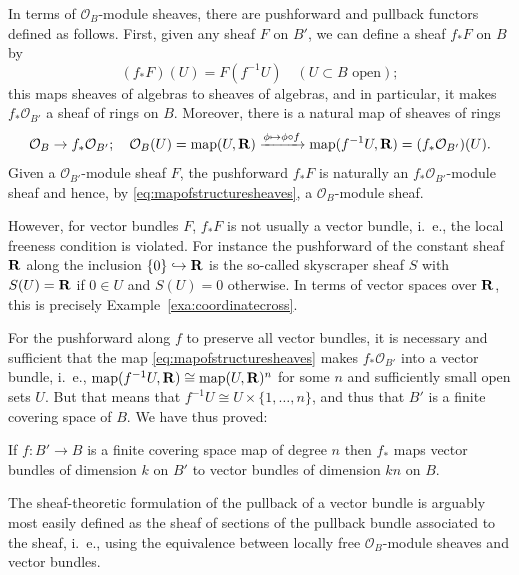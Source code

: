 \documentclass[a4paper,openany]{scrbook}
\begin{document}
In terms of $\mathcal O_B$-module sheaves, there are pushforward and pullback functors defined as follows. First, given any sheaf $F$ on $B'$, we can define a sheaf $f_*F$ on $B$ by
\[
(f_*F)(U) = F(f^{-1}U) \quad (U \subset B \text{ open});
\]
this maps sheaves of algebras to sheaves of algebras, and in particular, it makes $f_*\mathcal O_{B'}$ a sheaf of rings on $B$. Moreover, there is a natural map of sheaves of rings
\begin{equation}\label{eq:mapofstructuresheaves}
\mathcal O_{B} \to f_*\mathcal O_{B'}; \quad \mathcal O_B(U) = \operatorname{map}(U,\mathbf R) \xrightarrow{\phi \mapsto \phi \circ f} \operatorname{map}(f^{-1}U,\mathbf R) = (f_*\mathcal O_{B'})(U).
\end{equation}
Given a $\mathcal O_{B'}$-module sheaf $F$, the pushforward $f_*F$ is naturally an $f_*\mathcal O_{B'}$-module sheaf and hence, by \eqref{eq:mapofstructuresheaves}, a $\mathcal O_B$-module sheaf.

However, for vector bundles $F$, $f_*F$ is not usually a vector bundle, i.~e., the local freeness condition is violated. For instance the pushforward of the constant sheaf $\mathbf R$ along the inclusion $\{0\} \hookrightarrow \mathbf R$ is the so-called skyscraper sheaf $S$ with $S(U) = \mathbf R$ if $0 \in U$ and $S(U) = 0$ otherwise. In terms of vector spaces over $\mathbf R$, this is precisely Example~\ref{exa:coordinatecross}.

For the pushforward along $f$ to preserve all vector bundles, it is necessary and sufficient that the map \eqref{eq:mapofstructuresheaves} makes $f_*\mathcal O_{B'}$ into a vector bundle, i.~e., $\operatorname{map}(f^{-1}U,\mathbf R) \cong \operatorname{map}(U,\mathbf R)^n$ for some $n$ and sufficiently small open sets $U$. But that means that $f^{-1}U \cong U \times \{1,\dots,n\}$, and thus that $B'$ is a finite covering space of $B$. We have thus proved:

\begin{thm}\label{thm:covpushforward}
If $f\colon B' \to B$ is a finite covering space map of degree $n$ then $f_*$ maps vector bundles of dimension $k$ on $B'$ to vector bundles of dimension $kn$ on $B$.
\end{thm}

The sheaf-theoretic formulation of the pullback of a vector bundle is arguably most easily defined as the sheaf of sections of the pullback bundle associated to the sheaf, i.~e., using the equivalence between locally free $\mathcal O_B$-module sheaves and vector bundles.
\end{document}
